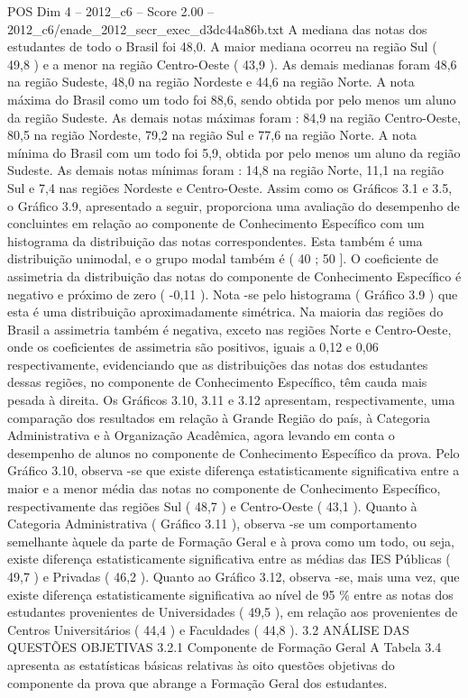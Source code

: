 \begin{textsample}{POS Dim 4 – 2012\_c6 – Score 2.00 – 2012\_c6/enade\_2012\_secr\_exec\_d3dc44a86b.txt}
A mediana das notas dos estudantes de todo o Brasil foi 48,0.
A maior mediana ocorreu na região Sul ( 49,8 ) e a menor na região Centro-Oeste ( 43,9 ).
As demais medianas foram 48,6 na região Sudeste, 48,0 na região Nordeste e 44,6 na região Norte.
A nota máxima do Brasil como um todo foi 88,6, sendo obtida por pelo menos um aluno da região Sudeste.
As demais notas máximas foram : 84,9 na região Centro-Oeste, 80,5 na região Nordeste, 79,2 na região Sul e 77,6 na região Norte.
A nota mínima do Brasil com um todo foi 5,9, obtida por pelo menos um aluno da região Sudeste.
As demais notas mínimas foram : 14,8 na região Norte, 11,1 na região Sul e 7,4 nas regiões Nordeste e Centro-Oeste.
Assim como os Gráficos 3.1 e 3.5, o Gráfico 3.9, apresentado a seguir, proporciona uma avaliação do desempenho de concluintes em relação ao componente de Conhecimento Específico com um histograma da distribuição das notas correspondentes.
Esta também é uma distribuição unimodal, e o grupo modal também é ( 40 ; 50 ].
O coeficiente de assimetria da distribuição das notas do componente de Conhecimento Específico é negativo e próximo de zero ( -0,11 ).
Nota -se pelo histograma ( Gráfico 3.9 ) que esta é uma distribuição aproximadamente simétrica.
Na maioria das regiões do Brasil a assimetria também é negativa, exceto nas regiões Norte e Centro-Oeste, onde os coeficientes de assimetria são positivos, iguais a 0,12 e 0,06 respectivamente, evidenciando que as distribuições das notas dos estudantes dessas regiões, no componente de Conhecimento Específico, têm cauda mais pesada à direita.
Os Gráficos 3.10, 3.11 e 3.12 apresentam, respectivamente, uma comparação dos resultados em relação à Grande Região do país, à Categoria Administrativa e à Organização Acadêmica, agora levando em conta o desempenho de alunos no componente de Conhecimento Específico da prova.
Pelo Gráfico 3.10, observa -se que existe diferença estatisticamente significativa entre a maior e a menor média das notas no componente de Conhecimento Específico, respectivamente das regiões Sul ( 48,7 ) e Centro-Oeste ( 43,1 ).
Quanto à Categoria Administrativa ( Gráfico 3.11 ), observa -se um comportamento semelhante àquele da parte de Formação Geral e à prova como um todo, ou seja, existe diferença estatisticamente significativa entre as médias das IES Públicas ( 49,7 ) e Privadas ( 46,2 ).
Quanto ao Gráfico 3.12, observa -se, mais uma vez, que existe diferença estatisticamente significativa ao nível de 95 \% entre as notas dos estudantes provenientes de Universidades ( 49,5 ), em relação aos provenientes de Centros Universitários ( 44,4 ) e Faculdades ( 44,8 ). 3.2 ANÁLISE DAS QUESTÕES OBJETIVAS 3.2.1 Componente de Formação Geral A Tabela 3.4 apresenta as estatísticas básicas relativas às oito questões objetivas do componente da prova que abrange a Formação Geral dos estudantes.

\end{textsample}
